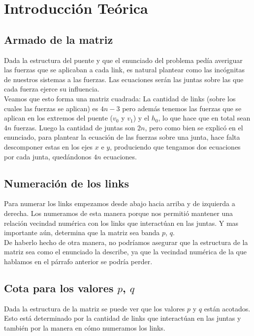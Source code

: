\section{Introducción Teórica}

\subsection{Armado de la matriz}

Dada la estructura del puente y que el enunciado del problema pedía averiguar las fuerzas que se aplicaban a cada link, es natural plantear como las incógnitas de nuestros sistemas a las fuerzas. Las ecuaciones serán las juntas sobre las que cada fuerza ejerce su influencia.\\

Veamos que esto forma una matriz cuadrada: La cantidad de links (sobre los cuales las fuerzas se aplican) es $4n - 3$ pero además tenemos las fuerzas que se aplican en los extremos del puente ($v_0$ y $v_1$) y el $h_0$, lo que hace que en total sean $4n$ fuerzas. Luego la cantidad de juntas son $2n$, pero como bien se explicó en el enunciado, para plantear la ecuación de las fuerzas sobre una junta, hace falta descomponer estas en los ejes $x$ e $y$, produciendo que tengamos dos ecuaciones por cada junta, quedándonos $4n$ ecuaciones.\\

\subsection{Numeración de los links}

Para numerar los links empezamos desde abajo hacia arriba y de izquierda a derecha. Los numeramos de esta manera porque nos permitió mantener una relación vecindad numérica con los links que interactúan en las juntas. Y mas importante aún, determina que la matriz sea banda $p$, $q$.\\

De haberlo hecho de otra manera, no podríamos asegurar que la estructura de la matriz sea como el enunciado la describe, ya que la vecindad numérica de la que hablamos en el párrafo anterior se podría perder.

\subsection{Cota para los valores $p$, $q$}

Dada la estructura de la matriz se puede ver que los valores $p$ y $q$ están acotados. Esto está determinado por la cantidad de links que interactúan en las juntas y también por la manera en cómo numeramos los links.\\

